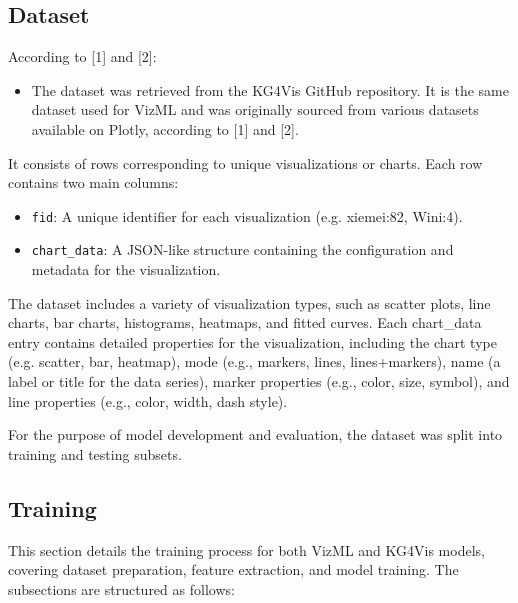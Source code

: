 \subsection{Dataset}

According to [1] and [2]:
\begin{itemize}
\item The dataset was retrieved from the KG4Vis GitHub repository. It is the same dataset used for VizML and was originally sourced from various datasets available on Plotly, according to [1] and [2].
\end{itemize}
\vspace{1.0cm}

It consists of rows corresponding to unique visualizations or charts. Each row contains two main columns:
\begin{itemize}
\item \texttt{fid}: A unique identifier for each visualization (e.g. xiemei:82, Wini:4).

\item \texttt{chart\_data}: A JSON-like structure containing the configuration and metadata for the visualization.
\end{itemize}

The dataset includes a variety of visualization types, such as scatter plots, line charts, bar charts, histograms, heatmaps, and fitted curves. Each chart\_data entry contains detailed properties for the visualization, including the chart type (e.g. scatter, bar, heatmap), mode (e.g., markers, lines, lines+markers), name (a label or title for the data series), marker properties (e.g., color, size, symbol), and line properties (e.g., color, width, dash style).
\medskip
\par
For the purpose of model development and evaluation, the dataset was split into training and testing subsets.

    
\subsection{Training}

This section details the training process for both VizML and KG4Vis models, covering dataset preparation, feature extraction, and model training. The subsections are structured as follows:

